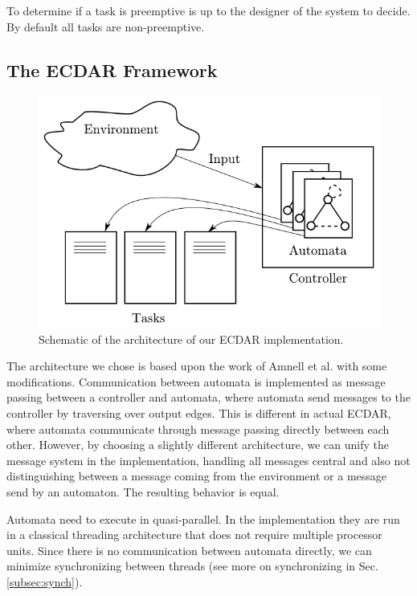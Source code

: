 To determine if a task is preemptive is up to the designer of the
system to decide. By default all tasks are non-preemptive.

\subsection{The ECDAR Framework}
\label{implementation-framework}

\begin{figure}[t]
\begin{centering}
\includegraphics[scale=0.5]{images/ecdar_architecture} 
\par\end{centering}

\caption{Schematic of the architecture of our ECDAR implementation.}
\end{figure}

The architecture we chose is based upon the work of Amnell et
al.\cite{amnell_code_2002} with some modifications. Communication between
automata is implemented as message passing between a controller and automata,
where automata send messages to the controller by traversing over output
edges. This is different in actual ECDAR, where automata communicate through
message passing directly between each other. However, by choosing a slightly
different architecture, we can unify the message system in the implementation,
handling all messages central and also not distinguishing between a message
coming from the environment or a message send by an automaton. The resulting
behavior is equal.

Automata need to execute in quasi-parallel. In the implementation they are run
in a classical threading architecture that does not require multiple processor
units. Since there is no communication between automata directly, we can
minimize synchronizing between threads (see more on synchronizing in
Sec. \ref{subsec:synch}).

